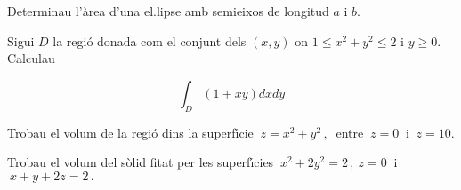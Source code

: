 \vspace{0.7 cm}
\probl Determinau l'{\`a}rea d'una el.lipse amb semieixos
de longitud $a$ i $b$. 

\vspace{0.7 cm}
\probl Sigui $D$ la regi{\'o} donada com el conjunt dels
$(x,y)$ on $1\leq x^2+y^2\leq 2$ i $y\geq 0$. Calculau

$$\int_D
(1+xy)dxdy
$$ 

\vspace{0.7 cm}
\probl Trobau el volum de la regi{\'o} dins la superf{\'\i}cie
$\ z=x^2+y^2\,,\ $ entre $\ z=0\ $ i $\ z=10$. 


\vspace{0.7 cm} 
\probl Trobau el volum del s{\`o}lid fitat per les
superf{\'\i}cies $\ x^2+2y^2=2\,,\ z=0\ $ i $\ x+y+2z=2\,.$ 






